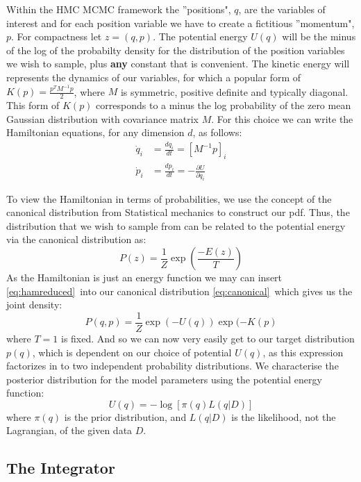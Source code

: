 \documentclass[twoside]{article}
\begin{document}
Within the HMC MCMC framework the ''positions", $q$, are the variables of interest and for each position variable we have to create a fictitious ''momentum", $p$. For compactness let $z = (q,p)$. The potential energy $U(q)$ will be the minus of the log of the probabilty density for the distribution of the position variables we wish to sample, plus \textbf{any} constant that is convenient.  The kinetic energy will represents the dynamics of our variables, for which a popular form of $K(p) = \frac{p^{T} M^{-1} p}{2}$, where $M$ is symmetric, positive definite and typically diagonal. This form of $K(p)$ corresponds to a minus the log probability of the zero mean Gaussian distribution with covariance matrix $M$. For this choice we can write the Hamiltonian equations, for any dimension $d$, as follows:
\begin{align}
\label{eq:ham1neal}
\dot{q}_{i} &= \frac{dq_{i}}{dt} = [M^{-1}p]_{i}\\
\label{eq:ham2neal}
\dot{p}_{i} &= \frac{dp_{i}}{dt} = -\frac{\partial U}{\partial q_{i}}
\end{align}

To view the Hamiltonian in terms of probabilities, we use the concept of the canonical distribution from Statistical mechanics to construct our pdf. Thus, the distribution that we wish to sample from can be related to the potential energy via the canonical distribution as:
\begin{equation}
\label{eq:canonical}
P(z) = \frac{1}{Z}\exp\left(\frac{-E(z)}{T}\right)
\end{equation}
As the Hamiltonian is just an energy function we may can insert \ref{eq:hamreduced}\ into our canonical distribution \ref{eq:canonical}\, which gives us the joint density:
\begin{equation}
P(q,p) = \frac{1}{Z}\exp(-U(q))\exp(-K(p)  
\end{equation}
where $T = 1$ is fixed. And so we can now very easily get to our target distribution $p(q)$, which is dependent on our choice of potential $U(q)$, as this expression factorizes in to two independent probability distributions. 
We characterise the posterior distribution for the model parameters using the potential energy function: \begin{equation}
U(q) = -\log[\pi(q)L(q|D)]
\end{equation}
where $\pi(q)$ is the prior distribution, and $L(q|D)$ is the likelihood, not the Lagrangian, of the given data $D$. 

\subsection{The Integrator}
\end{document}

